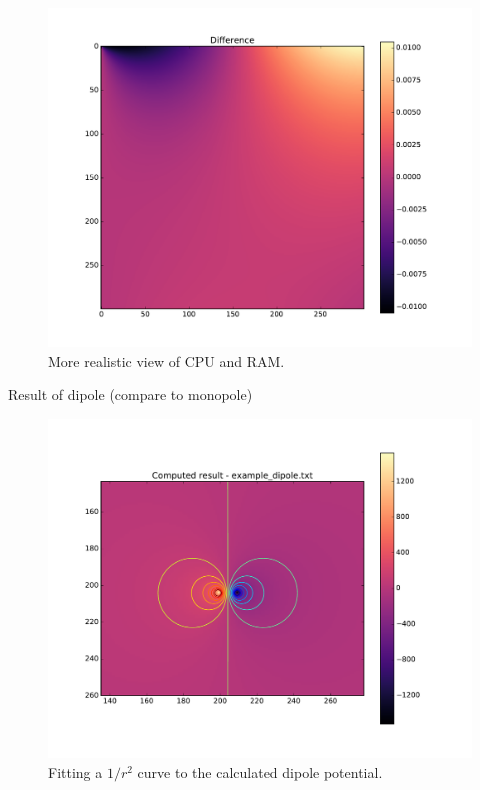 	\begin{figure}
	\centering
	\includegraphics[width=1.1\linewidth]{sin300_diff.pdf}
	\caption{More realistic view of CPU and RAM.} \label{fig:1b}
	\end{figure}


Result of dipole (compare to monopole)

	\begin{figure}[h]
	\centering
	\center
	\includegraphics[width=1.1\linewidth]{dipole_contours.pdf}
	\caption{Fitting a $1/r^2$ curve to the calculated dipole potential.} \label{fig:dipolefit}
	\end{figure}

